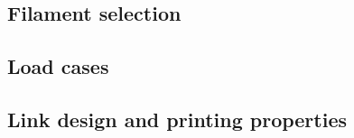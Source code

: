 \documentclass[../TFG_Report.tex]{subfiles}
\begin{document}
	
\subsection{Filament selection}

\subsection{Load cases}

\subsection{Link design and printing properties}




	
\end{document}
